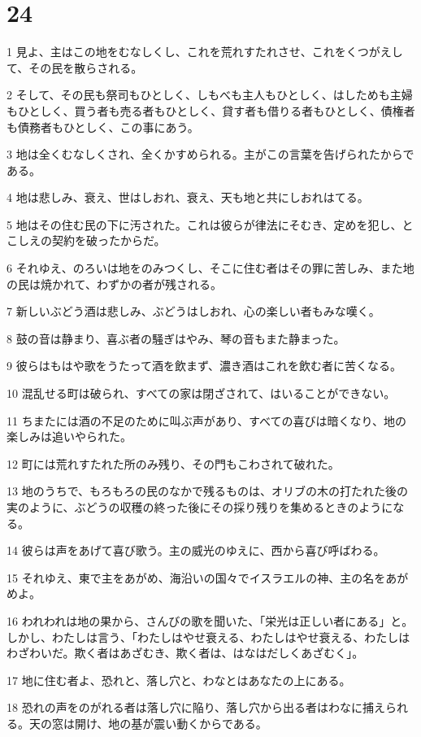 \chapter{24}

\par 1 見よ、主はこの地をむなしくし、これを荒れすたれさせ、これをくつがえして、その民を散らされる。
\par 2 そして、その民も祭司もひとしく、しもべも主人もひとしく、はしためも主婦もひとしく、買う者も売る者もひとしく、貸す者も借りる者もひとしく、債権者も債務者もひとしく、この事にあう。
\par 3 地は全くむなしくされ、全くかすめられる。主がこの言葉を告げられたからである。
\par 4 地は悲しみ、衰え、世はしおれ、衰え、天も地と共にしおれはてる。
\par 5 地はその住む民の下に汚された。これは彼らが律法にそむき、定めを犯し、とこしえの契約を破ったからだ。
\par 6 それゆえ、のろいは地をのみつくし、そこに住む者はその罪に苦しみ、また地の民は焼かれて、わずかの者が残される。
\par 7 新しいぶどう酒は悲しみ、ぶどうはしおれ、心の楽しい者もみな嘆く。
\par 8 鼓の音は静まり、喜ぶ者の騒ぎはやみ、琴の音もまた静まった。
\par 9 彼らはもはや歌をうたって酒を飲まず、濃き酒はこれを飲む者に苦くなる。
\par 10 混乱せる町は破られ、すべての家は閉ざされて、はいることができない。
\par 11 ちまたには酒の不足のために叫ぶ声があり、すべての喜びは暗くなり、地の楽しみは追いやられた。
\par 12 町には荒れすたれた所のみ残り、その門もこわされて破れた。
\par 13 地のうちで、もろもろの民のなかで残るものは、オリブの木の打たれた後の実のように、ぶどうの収穫の終った後にその採り残りを集めるときのようになる。
\par 14 彼らは声をあげて喜び歌う。主の威光のゆえに、西から喜び呼ばわる。
\par 15 それゆえ、東で主をあがめ、海沿いの国々でイスラエルの神、主の名をあがめよ。
\par 16 われわれは地の果から、さんびの歌を聞いた、「栄光は正しい者にある」と。しかし、わたしは言う、「わたしはやせ衰える、わたしはやせ衰える、わたしはわざわいだ。欺く者はあざむき、欺く者は、はなはだしくあざむく」。
\par 17 地に住む者よ、恐れと、落し穴と、わなとはあなたの上にある。
\par 18 恐れの声をのがれる者は落し穴に陥り、落し穴から出る者はわなに捕えられる。天の窓は開け、地の基が震い動くからである。
